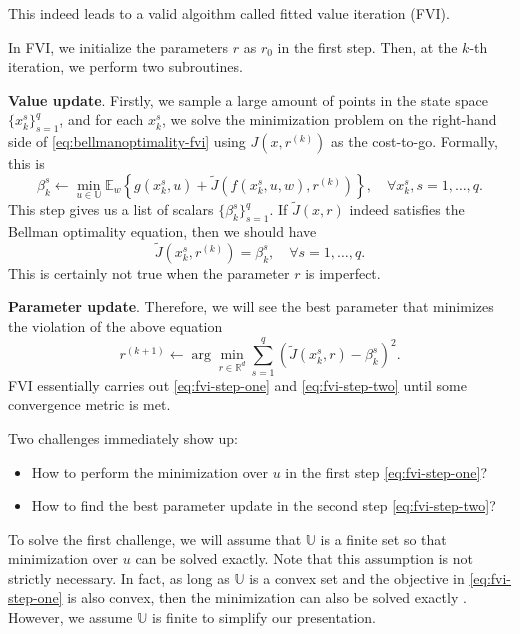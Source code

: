 \documentclass[
]{book}
\theoremstyle{definition}
\theoremstyle{definition}
\theoremstyle{definition}
\theoremstyle{definition}
\theoremstyle{remark}
\begin{document}
This indeed leads to a valid algoithm called fitted value iteration (FVI).

In FVI, we initialize the parameters \(r\) as \(r_0\) in the first step. Then, at the \(k\)-th iteration, we perform two subroutines.

\textbf{Value update}. Firstly, we sample a large amount of points in the state space \(\{x_k^s \}_{s=1}^q\), and for each \(x_k^s\), we solve the minimization problem on the right-hand side of \eqref{eq:bellmanoptimality-fvi} using \(J(x,r^{(k)})\) as the cost-to-go. Formally, this is
\begin{equation}
\beta_k^s \leftarrow \min_{u \in \mathbb{U}} \mathbb{E}_w \left\{ g(x_k^s, u) + \tilde{J}(f(x_k^s,u,w),r^{(k)}) \right\}, \quad \forall x_k^s, s= 1,\dots,q.
\label{eq:fvi-step-one}
\end{equation}
This step gives us a list of scalars \(\{ \beta_k^s \}_{s=1}^q\). If \(\tilde{J}(x,r)\) indeed satisfies the Bellman optimality equation, then we should have
\[
\tilde{J}(x_k^s,r^{(k)}) = \beta_k^s, \quad \forall s = 1,\dots,q.
\]
This is certainly not true when the parameter \(r\) is imperfect.

\textbf{Parameter update}. Therefore, we will see the best parameter that minimizes the violation of the above equation
\begin{equation}
r^{(k+1)} \leftarrow \arg\min_{r \in \mathbb{R}^d} \sum_{s=1}^q \left(\tilde{J}(x_k^s,r) -  \beta_k^s\right)^2.
\label{eq:fvi-step-two}
\end{equation}
FVI essentially carries out \eqref{eq:fvi-step-one} and \eqref{eq:fvi-step-two} until some convergence metric is met.

Two challenges immediately show up:

\begin{itemize}
\item
  How to perform the minimization over \(u\) in the first step \eqref{eq:fvi-step-one}?
\item
  How to find the best parameter update in the second step \eqref{eq:fvi-step-two}?
\end{itemize}

To solve the first challenge, we will assume that \(\mathbb{U}\) is a finite set so that minimization over \(u\) can be solved exactly. Note that this assumption is not strictly necessary. In fact, as long as \(\mathbb{U}\) is a convex set and the objective in \eqref{eq:fvi-step-one} is also convex, then the minimization can also be solved exactly \citep{yang23arxiv-value}. However, we assume \(\mathbb{U}\) is finite to simplify our presentation.
\end{document}
